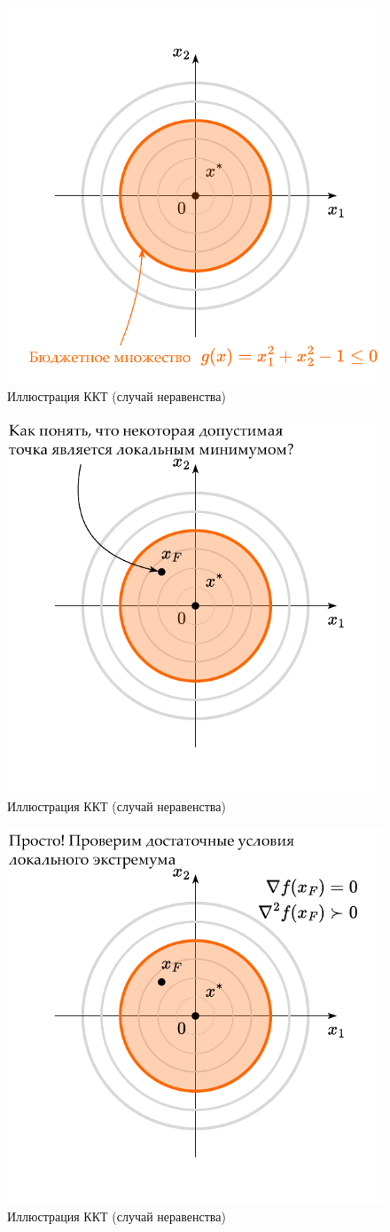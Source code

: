\documentclass[
  russian,
  letterpaper,
  DIV=11,
  numbers=noendperiod]{scrartcl}
\begin{document}
\begin{figure}[H]

{\centering \includegraphics[width=0.5\linewidth,height=\textheight,keepaspectratio]{ineq_constr_2_ru.pdf}

}

\caption{Иллюстрация ККТ (случай неравенства)}

\end{figure}%

\begin{figure}[H]

{\centering \includegraphics[width=0.5\linewidth,height=\textheight,keepaspectratio]{ineq_constr_3_ru.pdf}

}

\caption{Иллюстрация ККТ (случай неравенства)}

\end{figure}%

\begin{figure}[H]

{\centering \includegraphics[width=0.5\linewidth,height=\textheight,keepaspectratio]{ineq_constr_4_ru.pdf}

}

\caption{Иллюстрация ККТ (случай неравенства)}

\end{figure}%
\end{document}

